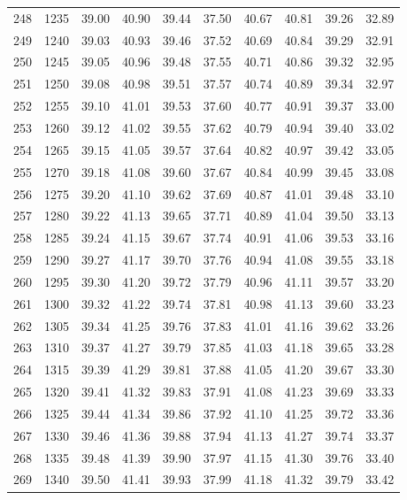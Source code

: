 \begin{longtable}{rrllllllll}
248 & 1235 & 39.00 & 40.90 & 39.44 & 37.50 & 40.67 & 40.81 & 39.26 & 32.89 \\ 
249 & 1240 & 39.03 & 40.93 & 39.46 & 37.52 & 40.69 & 40.84 & 39.29 & 32.91 \\ 
250 & 1245 & 39.05 & 40.96 & 39.48 & 37.55 & 40.71 & 40.86 & 39.32 & 32.95 \\ 
251 & 1250 & 39.08 & 40.98 & 39.51 & 37.57 & 40.74 & 40.89 & 39.34 & 32.97 \\ 
252 & 1255 & 39.10 & 41.01 & 39.53 & 37.60 & 40.77 & 40.91 & 39.37 & 33.00 \\ 
253 & 1260 & 39.12 & 41.02 & 39.55 & 37.62 & 40.79 & 40.94 & 39.40 & 33.02 \\ 
254 & 1265 & 39.15 & 41.05 & 39.57 & 37.64 & 40.82 & 40.97 & 39.42 & 33.05 \\ 
255 & 1270 & 39.18 & 41.08 & 39.60 & 37.67 & 40.84 & 40.99 & 39.45 & 33.08 \\ 
256 & 1275 & 39.20 & 41.10 & 39.62 & 37.69 & 40.87 & 41.01 & 39.48 & 33.10 \\ 
257 & 1280 & 39.22 & 41.13 & 39.65 & 37.71 & 40.89 & 41.04 & 39.50 & 33.13 \\ 
258 & 1285 & 39.24 & 41.15 & 39.67 & 37.74 & 40.91 & 41.06 & 39.53 & 33.16 \\ 
259 & 1290 & 39.27 & 41.17 & 39.70 & 37.76 & 40.94 & 41.08 & 39.55 & 33.18 \\ 
260 & 1295 & 39.30 & 41.20 & 39.72 & 37.79 & 40.96 & 41.11 & 39.57 & 33.20 \\ 
261 & 1300 & 39.32 & 41.22 & 39.74 & 37.81 & 40.98 & 41.13 & 39.60 & 33.23 \\ 
262 & 1305 & 39.34 & 41.25 & 39.76 & 37.83 & 41.01 & 41.16 & 39.62 & 33.26 \\ 
263 & 1310 & 39.37 & 41.27 & 39.79 & 37.85 & 41.03 & 41.18 & 39.65 & 33.28 \\ 
264 & 1315 & 39.39 & 41.29 & 39.81 & 37.88 & 41.05 & 41.20 & 39.67 & 33.30 \\ 
265 & 1320 & 39.41 & 41.32 & 39.83 & 37.91 & 41.08 & 41.23 & 39.69 & 33.33 \\ 
266 & 1325 & 39.44 & 41.34 & 39.86 & 37.92 & 41.10 & 41.25 & 39.72 & 33.36 \\ 
267 & 1330 & 39.46 & 41.36 & 39.88 & 37.94 & 41.13 & 41.27 & 39.74 & 33.37 \\ 
268 & 1335 & 39.48 & 41.39 & 39.90 & 37.97 & 41.15 & 41.30 & 39.76 & 33.40 \\ 
269 & 1340 & 39.50 & 41.41 & 39.93 & 37.99 & 41.18 & 41.32 & 39.79 & 33.42 \\ 

\end{longtable}
